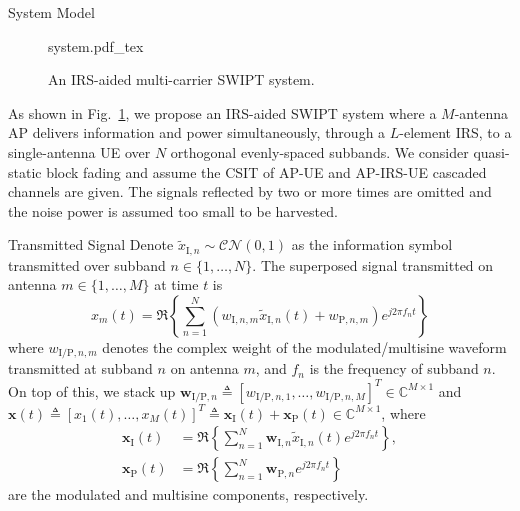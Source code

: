 \documentclass[journal]{IEEEtran}
\begin{document}
	\begin{section}{System Model}\label{se:system_model}
		\begin{figure}[!t]
			\centering
			\def\svgwidth{0.9\columnwidth}
			{system.pdf_tex}
			\caption{An IRS-aided multi-carrier SWIPT system.}
			\label{fi:system}
		\end{figure}

		As shown in Fig.~\ref{fi:system}, we propose an IRS-aided SWIPT system where a $M$-antenna AP delivers information and power simultaneously, through a $L$-element IRS, to a single-antenna UE over $N$ orthogonal evenly-spaced subbands. We consider quasi-static block fading and assume the CSIT of AP-UE and AP-IRS-UE cascaded channels are given. The signals reflected by two or more times are omitted and the noise power is assumed too small to be harvested.


		\begin{subsection}{Transmitted Signal}
			Denote $\tilde{x}_{\mathrm{I},n}\sim\mathcal{CN}(0,1)$ as the information symbol transmitted over subband $n \in \{1, \dots, N\}$. The superposed signal transmitted on antenna $m \in \{1, \dots, M\}$ at time $t$ is
			\begin{equation}\label{eq:x_m}
				x_m(t)=\Re\left\{\sum_{n=1}^N\left({w_{\mathrm{I},n,m}\tilde{x}_{\mathrm{I},n}(t)}+w_{\mathrm{P},n,m}\right){e^{j2{\pi}{f_n}{t}}}\right\}
			\end{equation}
			where $w_{\mathrm{I/P},n,m}$ denotes the complex weight of the modulated/multisine waveform transmitted at subband $n$ on antenna $m$, and $f_n$ is the frequency of subband $n$. On top of this, we stack up $\boldsymbol{w}_{\mathrm{I/P},n} \triangleq [w_{\mathrm{I/P},n,1},\dots,w_{\mathrm{I/P},n,M}]^T \in \mathbb{C}^{M \times 1}$ and $\boldsymbol{x}(t) \triangleq [x_1(t),\dots,x_M(t)]^T \triangleq \boldsymbol{x}_{\mathrm{I}}(t)+\boldsymbol{x}_{\mathrm{P}}(t) \in \mathbb{C}^{M \times 1}$, where
			\begin{align}
				\boldsymbol{x}_{\mathrm{I}}(t) &= \Re{\left\{\sum_{n=1}^N\boldsymbol{w}_{\mathrm{I},n}\tilde{x}_{\mathrm{I},n}(t){e^{j2{\pi}{f_n}{t}}}\right\}},\label{eq:x_I}\\
				\boldsymbol{x}_{\mathrm{P}}(t) &= \Re{\left\{\sum_{n=1}^N\boldsymbol{w}_{\mathrm{P},n}{e^{j2{\pi}{f_n}{t}}}\right\}}\label{eq:x_P}
			\end{align}
			are the modulated and multisine components, respectively.
		\end{subsection}



\end{section}
\end{document}
